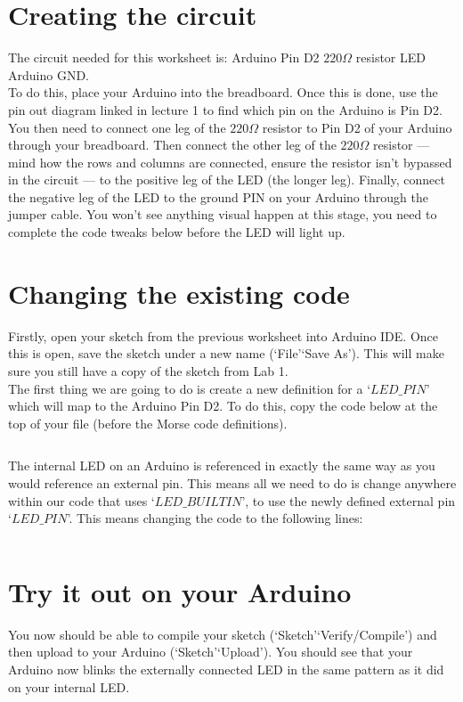 \documentclass[11pt,a4paper]{article}
\begin{document}
\section{Creating the circuit}
The circuit needed for this worksheet is: Arduino Pin D2 \textrightarrow $220\Omega$ resistor \textrightarrow LED
\textrightarrow Arduino GND.\\

\noindent
To do this, place your Arduino into the breadboard. Once this is done, use the pin out diagram linked in lecture 1 to find which pin on the Arduino is Pin D2. You then need to connect one leg of the $220\Omega$ resistor to Pin D2 of your Arduino through your breadboard. Then connect the other leg of the $220\Omega$ resistor  --- mind how the rows and columns are connected, ensure the resistor isn't bypassed in the circuit --- to the positive leg of the LED (the longer leg). Finally, connect the negative leg of the LED to the ground PIN on your Arduino through the jumper cable. You won't see anything visual happen at this stage, you need to complete the code tweaks below before the LED will light up.

\section{Changing the existing code}
Firstly, open your sketch from the previous worksheet into Arduino IDE. Once this is open, save the sketch under a new name (`File'\textrightarrow `Save As'). This will make sure you still have a copy of the sketch from Lab 1.\\

\noindent
The first thing we are going to do is create a new definition for a `$LED\_PIN$' which will map to the Arduino Pin D2. To do this, copy the code below at the top of your file (before the Morse code definitions).

\inputminted{arduino}{./src/1-pin-definition.txt}

\noindent
The internal LED on an Arduino is referenced in exactly the same way as you would reference an external pin. This means all we need to do is change anywhere within our code that uses `$LED\_BUILTIN$', to use the newly defined external pin `$LED\_PIN$'. This means changing the code to the following lines:

\inputminted{arduino}{./src/2-pins.txt}

\section*{Try it out on your Arduino}
You now should be able to compile your sketch (`Sketch'\textrightarrow `Verify/Compile') and then upload to your Arduino (`Sketch'\textrightarrow `Upload'). You should see that your Arduino now blinks the externally connected LED in the same pattern as it did on your internal LED.\\
\end{document}
